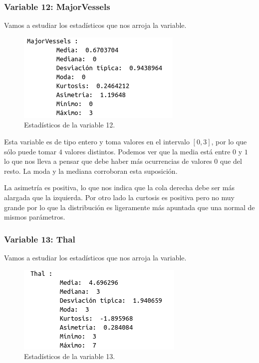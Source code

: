 \documentclass[12pt,a4paper]{article}
\begin{document}
\subsubsection*{Variable 12: MajorVessels}

Vamos a estudiar los estadísticos que nos arroja la variable.

\begin{figure}[H]
	\centering
	\includegraphics[scale=0.7]{./Imagenes/EDA/Clasificacion/estadisticos_variable12.png}
	\caption{Estadísticos de la variable 12.}
\end{figure}

Esta variable es de tipo entero y toma valores en el intervalo $[0,3]$, por lo que sólo puede tomar $4$ valores distintos. Podemos ver que la media está entre $0$ y $1$ lo que nos lleva a pensar que debe haber más ocurrencias de valores $0$ que del resto. La moda y la mediana corroboran esta suposición. 

La asimetría es positiva, lo que nos indica que la cola derecha debe ser más alargada que la izquierda. Por otro lado la curtosis es positiva pero no muy grande por lo que la distribución es ligeramente más apuntada que una normal de mismos parámetros.

\subsubsection*{Variable 13: Thal}

Vamos a estudiar los estadísticos que nos arroja la variable.

\begin{figure}[H]
	\centering
	\includegraphics[scale=0.7]{./Imagenes/EDA/Clasificacion/estadisticos_variable13.png}
	\caption{Estadísticos de la variable 13.}
\end{figure}
\end{document}

